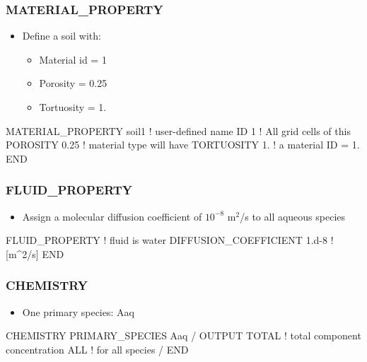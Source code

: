 \documentclass{beamer}
\newcommand\redcomment[1]{{{\color{red} #1}}}
\newcommand\bluecomment[1]{{{\color{blue} #1}}}
\begin{document}
\begin{frame}\frametitle{MATERIAL\_PROPERTY}

\begin{itemize}
  \item Define a soil with:
  \begin{itemize}
    \item Material id = 1
    \item Porosity = 0.25
    \item Tortuosity = 1.
  \end{itemize}
\end{itemize}

\begin{semiverbatim}


MATERIAL_PROPERTY soil1  \bluecomment{! user-defined name}
  ID 1                   \bluecomment{! All grid cells of this}
  POROSITY 0.25          \bluecomment{!   material type will have}
  TORTUOSITY 1.          \bluecomment{!   a material \redcomment{ID = 1}.}
END
\end{semiverbatim}

\end{frame}

\begin{frame}\frametitle{FLUID\_PROPERTY}

\begin{itemize}
  \item Assign a molecular diffusion coefficient of $10^{-8}$ m$^2$/s to all aqueous species
\end{itemize}

\begin{semiverbatim}

FLUID_PROPERTY                  \bluecomment{! fluid is water}
  DIFFUSION_COEFFICIENT 1.d-8   \bluecomment{! [m^2/s]}
END
\end{semiverbatim}

\end{frame}

\begin{frame}[fragile]\frametitle{CHEMISTRY}

\begin{itemize}
  \item One primary species: Aaq
\end{itemize}

\begin{semiverbatim}
CHEMISTRY
  PRIMARY_SPECIES
    Aaq
  /
  OUTPUT
    TOTAL        \bluecomment{! total component concentration}
    ALL          \bluecomment{! for all species}
  /
END
\end{semiverbatim}

\end{frame}
\end{document}
